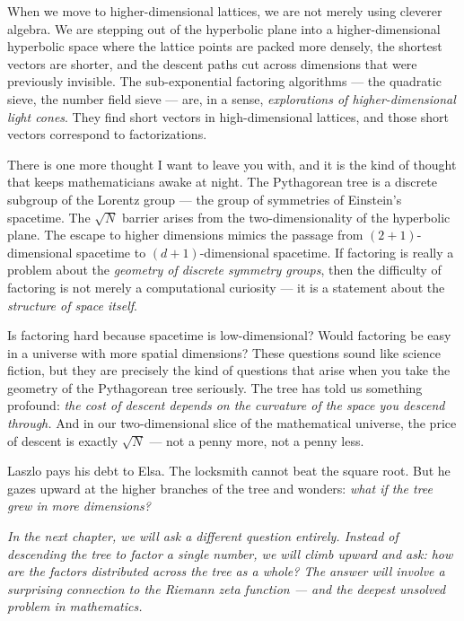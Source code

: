 \documentclass[11pt,twoside,openright]{book}
\theoremstyle{definition}
\theoremstyle{remark}
\begin{document}
When we move to higher-dimensional lattices, we are not merely using cleverer algebra. We are stepping out of the hyperbolic plane into a higher-dimensional hyperbolic space where the lattice points are packed more densely, the shortest vectors are shorter, and the descent paths cut across dimensions that were previously invisible. The sub-exponential factoring algorithms --- the quadratic sieve, the number field sieve --- are, in a sense, \textit{explorations of higher-dimensional light cones}. They find short vectors in high-dimensional lattices, and those short vectors correspond to factorizations.

There is one more thought I want to leave you with, and it is the kind of thought that keeps mathematicians awake at night. The Pythagorean tree is a discrete subgroup of the Lorentz group --- the group of symmetries of Einstein's spacetime. The $\sqrt{N}$ barrier arises from the two-dimensionality of the hyperbolic plane. The escape to higher dimensions mimics the passage from $(2+1)$-dimensional spacetime to $(d+1)$-dimensional spacetime. If factoring is really a problem about the \textit{geometry of discrete symmetry groups}, then the difficulty of factoring is not merely a computational curiosity --- it is a statement about the \textit{structure of space itself}.

Is factoring hard because spacetime is low-dimensional? Would factoring be easy in a universe with more spatial dimensions? These questions sound like science fiction, but they are precisely the kind of questions that arise when you take the geometry of the Pythagorean tree seriously. The tree has told us something profound: \textit{the cost of descent depends on the curvature of the space you descend through.} And in our two-dimensional slice of the mathematical universe, the price of descent is exactly $\sqrt{N}$ --- not a penny more, not a penny less.

Laszlo pays his debt to Elsa. The locksmith cannot beat the square root. But he gazes upward at the higher branches of the tree and wonders: \textit{what if the tree grew in more dimensions?}



\textit{In the next chapter, we will ask a different question entirely. Instead of descending the tree to factor a single number, we will climb upward and ask: how are the factors distributed across the tree as a whole? The answer will involve a surprising connection to the Riemann zeta function --- and the deepest unsolved problem in mathematics.}
\end{document}

